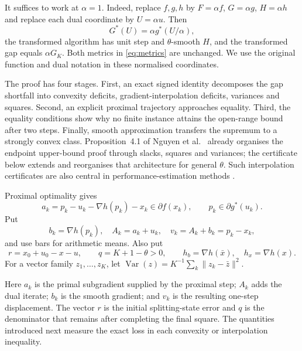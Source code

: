 \documentclass[11pt,a4paper]{article}
\theoremstyle{remark}\newtheorem{remark}[theorem]{Remark}
\DeclareMathOperator{\Var}{Var}
\newcommand{\norm}[1]{\lVert #1\rVert}
\begin{document}
It suffices to work at $\alpha=1$. Indeed, replace $f,g,h$ by $F=\alpha f$, $G=\alpha g$, $H=\alpha h$ and replace each dual coordinate by $U=\alpha u$. Then
\[
G^*(U)=\alpha g^*(U/\alpha),
\]
the transformed algorithm has unit step and $\theta$-smooth $H$, and the transformed gap equals $\alpha G_K$. Both metrics in \eqref{eq:metrics} are unchanged. We use the original function and dual notation in these normalised coordinates.

The proof has four stages. First, an exact signed identity decomposes the gap shortfall into convexity deficits, gradient-interpolation deficits, variances and squares. Second, an explicit proximal trajectory approaches equality. Third, the equality conditions show why no finite instance attains the open-range bound after two steps. Finally, smooth approximation transfers the supremum to a strongly convex class. Proposition~4.1 of Nguyen et al.~\cite{nguyen2025} already organises the endpoint upper-bound proof through slacks, squares and variances; the certificate below extends and reorganises that architecture for general $\theta$. Such interpolation certificates are also central in performance-estimation methods \cite{taylor2017,ryu2020}.

Proximal optimality gives
\begin{equation}\label{eq:subgradients}
a_k=p_k-u_k-\nabla h(p_k)-x_k\in\partial f(x_k),
\qquad p_k\in\partial g^*(u_k).
\end{equation}
Put
\[
b_k=\nabla h(p_k),\quad A_k=a_k+u_k,\quad v_k=A_k+b_k=p_k-x_k,
\]
and use bars for arithmetic means. Also put
\[
r=x_0+u_0-x-u,\qquad q=K+1-\theta>0,\qquad
h_b=\nabla h(\bar x),\quad h_x=\nabla h(x).
\]
For a vector family $z_1,\ldots,z_K$, let $\Var(z)=K^{-1}\sum_k\norm{z_k-\bar z}^2$.

Here $a_k$ is the primal subgradient supplied by the proximal step; $A_k$ adds the dual iterate; $b_k$ is the smooth gradient; and $v_k$ is the resulting one-step displacement. The vector $r$ is the initial splitting-state error and $q$ is the denominator that remains after completing the final square. The quantities introduced next measure the exact loss in each convexity or interpolation inequality.
\end{document}
